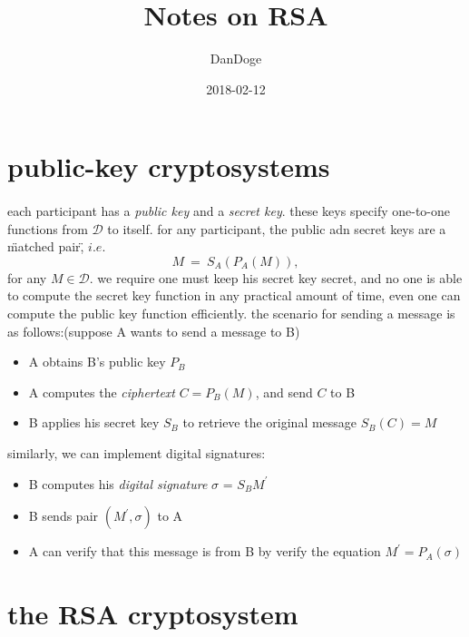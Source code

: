 \documentclass{article}
\title{Notes on RSA}
\date{2018-02-12}
\author{DanDoge}
\begin{document}
\section{public-key cryptosystems}
  \paragraph{} each participant has a \textit{public key} and a \textit{secret key}. these keys specify one-to-one functions from $\mathcal{D}$ to itself. for any participant, the public adn secret keys are a \"matched pair\", $i.e.$
  \begin{equation}
    M\ =\ S_A(P_A(M)),
  \end{equation}
  for any $M \in \mathcal{D}$. we require one must keep his secret key secret, and no one is able to compute the secret key function in any practical amount of time, even one can compute the public key function efficiently. the scenario for sending a message is as follows:(suppose A wants to send a message to B)
  \begin{itemize}
    \item A obtains B's public key $P_B$
    \item A computes the \textit{ciphertext} $C = P_B(M)$, and send $C$ to B
    \item B applies his secret key $S_B$ to retrieve the original message $S_B(C) = M$
  \end{itemize}
  similarly, we can implement digital signatures:
  \begin{itemize}
    \item B computes his \textit{digital signature} $\sigma$ = $S_B{M^{'}}$
    \item B sends pair $(M^{'}, \sigma)$ to A
    \item A can verify that this message is from B by verify the equation $M^{'} = P_A(\sigma)$
  \end{itemize}

\section{the RSA cryptosystem}
\end{document}
